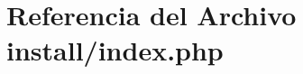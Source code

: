 \hypertarget{install_2index_8php}{\section{Referencia del Archivo install/index.php}
\label{install_2index_8php}
}
